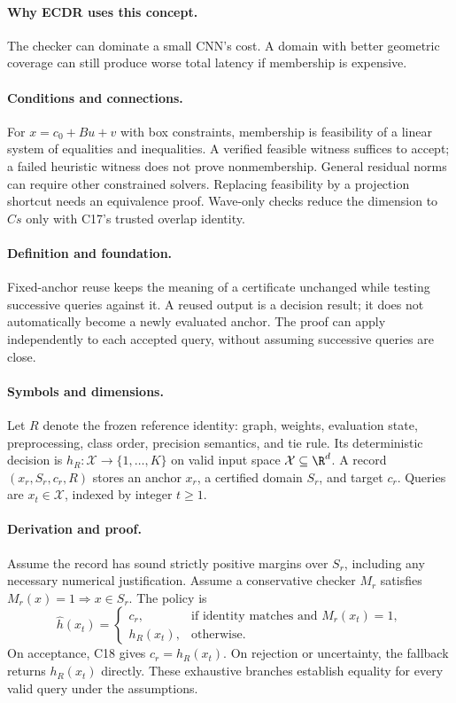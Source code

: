 \paragraph{Why ECDR uses this concept.}
The checker can dominate a small CNN's cost. A domain with better geometric coverage can still produce worse total latency if membership is expensive.
\paragraph{Conditions and connections.}
For $x=c_0+Bu+v$ with box constraints, membership is feasibility of a linear system of equalities and inequalities. A verified feasible witness suffices to accept; a failed heuristic witness does not prove nonmembership. General residual norms can require other constrained solvers. Replacing feasibility by a projection shortcut needs an equivalence proof. Wave-only checks reduce the dimension to $Cs$ only with C17's trusted overlap identity.

\paragraph{Definition and foundation.}
Fixed-anchor reuse keeps the meaning of a certificate unchanged while testing successive queries against it. A reused output is a decision result; it does not automatically become a newly evaluated anchor. The proof can apply independently to each accepted query, without assuming successive queries are close.
\paragraph{Symbols and dimensions.}
Let $R$ denote the frozen reference identity: graph, weights, evaluation state, preprocessing, class order, precision semantics, and tie rule. Its deterministic decision is $h_R:\mathcal X\to\{1,\ldots,K\}$ on valid input space $\mathcal X\subseteq\R^d$. A record $(x_r,S_r,c_r,R)$ stores an anchor $x_r$, a certified domain $S_r$, and target $c_r$. Queries are $x_t\in\mathcal X$, indexed by integer $t\ge1$.
\paragraph{Derivation and proof.}
Assume the record has sound strictly positive margins over $S_r$, including any necessary numerical justification. Assume a conservative checker $M_r$ satisfies $M_r(x)=1\Rightarrow x\in S_r$. The policy is
\[
 \widehat h(x_t)=
 \begin{cases}c_r,&\text{if identity matches and }M_r(x_t)=1,\\
 h_R(x_t),&\text{otherwise.}\end{cases}
\]
On acceptance, C18 gives $c_r=h_R(x_t)$. On rejection or uncertainty, the fallback returns $h_R(x_t)$ directly. These exhaustive branches establish equality for every valid query under the assumptions.
